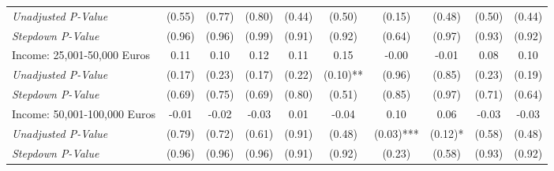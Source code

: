 \begin{tabular}{l c c c c c c c c c}
\quad \textit{Unadjusted P-Value} & (0.55) & (0.77) & (0.80) & (0.44) & (0.50) & (0.15) & (0.48) & (0.50) & (0.44) \\
\quad \textit{Stepdown P-Value} & (0.96) & (0.96) & (0.99) & (0.91) & (0.92) & (0.64) & (0.97) & (0.93) & (0.92) \\
Income: 25,001-50,000 Euros & 0.11 & 0.10 & 0.12 & 0.11 & 0.15 & -0.00 & -0.01 & 0.08 & 0.10 \\
\quad \textit{Unadjusted P-Value} & (0.17) & (0.23) & (0.17) & (0.22) & (0.10)** & (0.96) & (0.85) & (0.23) & (0.19) \\
\quad \textit{Stepdown P-Value} & (0.69) & (0.75) & (0.69) & (0.80) & (0.51) & (0.85) & (0.97) & (0.71) & (0.64) \\
Income: 50,001-100,000 Euros & -0.01 & -0.02 & -0.03 & 0.01 & -0.04 & 0.10 & 0.06 & -0.03 & -0.03 \\
\quad \textit{Unadjusted P-Value} & (0.79) & (0.72) & (0.61) & (0.91) & (0.48) & (0.03)*** & (0.12)* & (0.58) & (0.48) \\
\quad \textit{Stepdown P-Value} & (0.96) & (0.96) & (0.96) & (0.91) & (0.92) & (0.23) & (0.58) & (0.93) & (0.92) \\
\bottomrule
\end{tabular}
